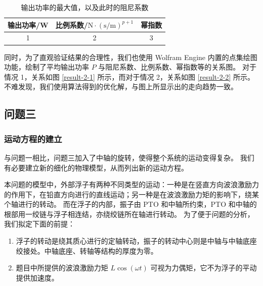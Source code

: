 \begin{table}[htbp]
    \centering
    \begin{tabular}{ccc}
        \toprule
        输出功率/W & 比例系数/$\mathrm{N}\cdot(\mathrm{s}/\mathrm{m})^{p+1}$ & 幂指数 \\
        \midrule
        1 & 2 & 3 \\
        \bottomrule
    \end{tabular}
    \caption{输出功率的最大值，以及此时的阻尼系数}
    \label{answer-2-2}
\end{table}

同时，为了直观验证结果的合理性，我们也使用 Wolfram Engine 内置的点集绘图功能，绘制了平均输出功率 $P$ 与阻尼系数、比例系数、幂指数等的关系图。
对于情况 1，关系如图 \ref{result-2-1} 所示，而对于情况 2，关系如图 \ref{result-2-2} 所示。
不难发现，我们使用算法得到的优化解，与图上所显示出的走向趋势一致。

\subsection{问题三}

\subsubsection{运动方程的建立}

与问题一相比，问题三加入了中轴的旋转，使得整个系统的运动变得复杂。
我们有必要建立新的细化的物理模型，从而列出新的运动方程。

本问题的模型中，外部浮子有两种不同类型的运动：一种是在竖直方向波浪激励力的作用下，在铅直方向进行的直线运动；另一种是在波浪激励力矩的影响下，绕某个轴进行的转动。
而在浮子的内部，振子由 PTO 和中轴所约束，PTO 和中轴的根部用一绞链与浮子相连结，亦绕绞链所在轴进行转动。
为了便于问题的分析，我们拟定下面的前提：
\begin{enumerate}
    \item 浮子的转动是绕其质心进行的定轴转动，振子的转动中心则是中轴与中轴底座绞接处。中轴底座、转轴等结构的厚度为零。
    \item 题目中所提供的波浪激励力矩 $L\cos(\omega t)$ 可视为力偶矩，它不为浮子的平动提供加速度。
\end{enumerate}

